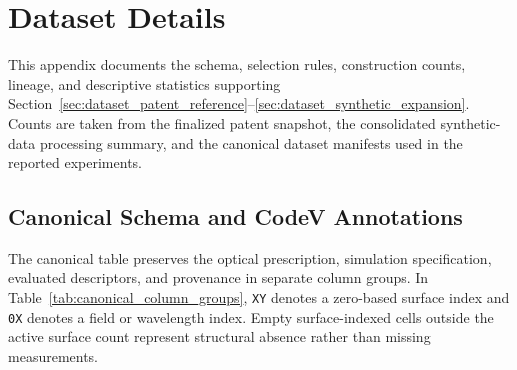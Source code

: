 \appendix

\section{Dataset Details}
\label{app:dataset_details}

This appendix documents the schema, selection rules, construction counts, lineage, and descriptive statistics supporting Section~\ref{sec:dataset_patent_reference}--\ref{sec:dataset_synthetic_expansion}. Counts are taken from the finalized patent snapshot, the consolidated synthetic-data processing summary, and the canonical dataset manifests used in the reported experiments.

\subsection{Canonical Schema and CodeV Annotations}
\label{app:dataset_schema}

The canonical table preserves the optical prescription, simulation specification, evaluated descriptors, and provenance in separate column groups. In Table~\ref{tab:canonical_column_groups}, \texttt{XY} denotes a zero-based surface index and \texttt{0X} denotes a field or wavelength index. Empty surface-indexed cells outside the active surface count represent structural absence rather than missing measurements.

